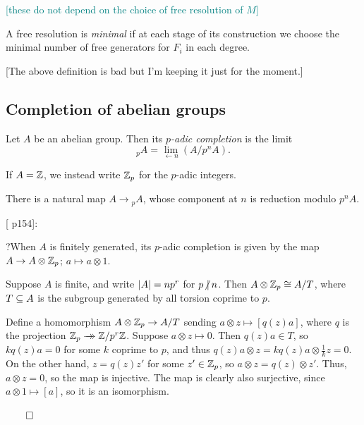 \documentclass{MetricNotes2023}
\newcommand{\surj}{\rightarrow\mathrel{\mkern-14mu}\rightarrow}
\def\subq{\ensuremath\subseteq}
\def\inte{\ensuremath\mathbb{Z}}
\DeclareMathOperator{\Ext}{Ext}
\DeclareMathOperator{\im}{im}
\def\done{\begin{flushright}\vspace{-4.35ex}\(\qed\)\end{flushright}}
\def\textcolour{\textcolor}
\def\nvert{\ensuremath\hspace{-0.5ex}\not\vert\hspace{0.5ex}}
\begin{document}

\textcolour{teal}{[these do not depend on the choice of free resolution of \(M\)]}

A free resolution is \textit{minimal} if at each stage of its construction we choose the minimal number of free generators for \(F_i\) in each degree.

[The above definition is bad but I'm keeping it just for the moment.]

\subsection{Completion of abelian groups}

\begin{definition}
Let \(A\) be an abelian group. Then its \textit{\(p\)-adic completion} is the limit 
\[\text{}_pA=\lim\limits_{\leftarrow n} (A/p^nA).\]
\end{definition}

If \(A=\inte\), we instead write \(\inte_p\) for the \(p\)-adic integers.

There is a natural map \(A \to \text{}_pA\), whose component at \(n\) is reduction modulo \(p^nA\). 

[\autocite{concise} p154]:

?When \(A\) is finitely generated, its \(p\)-adic completion is given by the map \(A \to A\otimes \inte_p\); \(a\mapsto a\otimes 1\). 

\begin{lemma}\label{2504031247}
Suppose \(A\) is finite, and write \(\lvert A\rvert=np^r\) for \(p\nvert n\). Then \(A\otimes\inte_p\cong A/T\), where \(T\subq A\) is the subgroup generated by all torsion coprime to \(p\).
\end{lemma}

\begin{ourproof}
Define a homomorphism \(A\otimes\inte_p\to A/T\) sending \(a\otimes z \mapsto [q(z)a]\), where \(q\) is the projection \(\inte_p \surj \inte/p^r\inte\). Suppose \(a\otimes z\mapsto 0\). Then \(q(z)a\in T\), so \(kq(z)a=0\) for some \(k\) coprime to \(p\), and thus \(q(z)a\otimes z=kq(z)a\otimes \frac{1}{k}z=0\). On the other hand, \(z=q(z)z'\) for some \(z'\in \inte_p\), so \(a\otimes z = q(z) \otimes z'\). Thus, \(a\otimes z = 0\), so the map is injective. The map is clearly also surjective, since \(a\otimes 1 \mapsto [a]\), so it is an isomorphism. \done
\end{ourproof}
\end{document}
